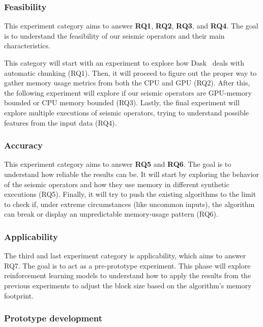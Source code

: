\subsubsection{Feasibility}
\label{subsubsec:feasibility-experiments}

This experiment category aims to answer \textbf{RQ1}, \textbf{RQ2}, \textbf{RQ3}, and \textbf{RQ4}.
The goal is to understand the feasibility of our seismic operators and their main characteristics.

This category will start with an experiment to explore how Dask~\cite{dask} deals with automatic chunking (RQ1).
Then, it will proceed to figure out the proper way to gather memory usage metrics from both the \ac{CPU} and \ac{GPU} (RQ2).
After this, the following experiment will explore if our seismic operators are \ac{GPU}-memory bounded or \ac{CPU} memory bounded (RQ3).
Lastly, the final experiment will explore multiple executions of seismic operators, trying to understand possible features from the input data (RQ4).

\subsubsection{Accuracy}
\label{subsubsec:accuracy-experiments}

This experiment category aims to answer \textbf{RQ5} and \textbf{RQ6}.
The goal is to understand how reliable the results can be.
It will start by exploring the behavior of the seismic operators and how they use memory in different synthetic executions (RQ5).
Finally, it will try to push the existing algorithms to the limit to check if, under extreme circumstances (like uncommon inputs), the algorithm can break or display an unpredictable memory-usage pattern (RQ6).

\subsubsection{Applicability}
\label{subsubsec:applicability-experiments}

The third and last experiment category is applicability, which aims to answer RQ7.
The goal is to act as a pre-prototype experiment.
This phase will explore reinforcement learning models to understand how to apply the results from the previous experiments to adjust the block size based on the algorithm's memory footprint.

\subsubsection{Prototype development}

